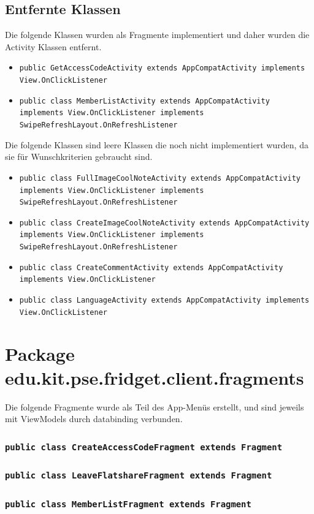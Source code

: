 \documentclass[a4paper]{scrreprt}
\begin{document}
		\subsection{Entfernte Klassen}
			Die folgende Klassen wurden als Fragmente implementiert und daher wurden die Activity Klassen entfernt.
			\begin{itemize}
				\item \texttt{public GetAccessCodeActivity extends AppCompatActivity implements View.OnClickListener}
				\item \texttt{public class MemberListActivity extends AppCompatActivity implements View.OnClickListener implements SwipeRefreshLayout.OnRefreshListener}
			\end{itemize}
			Die folgende Klassen sind leere Klassen die noch nicht implementiert wurden, da sie für Wunschkriterien gebraucht sind.
			\begin{itemize}
				\item \texttt{public class FullImageCoolNoteActivity extends AppCompatActivity implements View.OnClickListener implements SwipeRefreshLayout.OnRefreshListener}
				\item \texttt{public class CreateImageCoolNoteActivity extends AppCompatActivity implements View.OnClickListener implements SwipeRefreshLayout.OnRefreshListener}
				\item \texttt{public class CreateCommentActivity extends AppCompatActivity implements View.OnClickListener}
				\item \texttt{public class LanguageActivity extends AppCompatActivity implements View.OnClickListener}
			\end{itemize}
		
	
	 \section{Package edu.kit.pse.fridget.client.fragments} 
	Die folgende Fragmente wurde als Teil des App-Menüs erstellt, und sind jeweils mit ViewModels durch databinding verbunden. 
	\subsubsection{\texttt{public class CreateAccessCodeFragment extends Fragment}} 
	\subsubsection{\texttt{public class LeaveFlatshareFragment extends Fragment}} 
	\subsubsection{\texttt{public class MemberListFragment extends Fragment}} 
	
\end{document}
